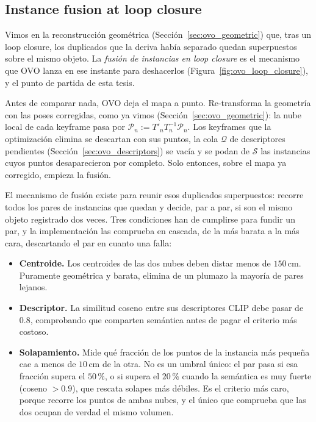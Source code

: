\subsection{Instance fusion at loop closure}
\label{sec:ovo_fusion_lc}

Vimos en la reconstrucción geométrica (Sección~\ref{sec:ovo_geometric}) que, tras un loop closure,
los duplicados que la deriva había separado quedan superpuestos sobre el mismo objeto. La
\emph{fusión de instancias en loop closure} es el mecanismo que OVO lanza en ese instante para
deshacerlos (Figura~\ref{fig:ovo_loop_closure}), y el punto de partida de esta tesis.

Antes de comparar nada, OVO deja el mapa a punto. Re-transforma la geometría con las poses
corregidas, como ya vimos (Sección~\ref{sec:ovo_geometric}): la nube local de cada keyframe pasa por
$\mathcal{P}_n := T'_n T_n^{-1} \mathcal{P}_n$. Los keyframes que la optimización elimina se descartan
con sus puntos, la cola $\mathcal{Q}$ de descriptores pendientes (Sección~\ref{sec:ovo_descriptors})
se vacía y se podan de $\mathcal{S}$ las instancias cuyos puntos desaparecieron por completo. Solo
entonces, sobre el mapa ya corregido, empieza la fusión.

El mecanismo de fusión existe para reunir esos duplicados superpuestos: recorre todos los pares de
instancias que quedan y decide, par a par, si son el mismo objeto registrado dos veces. Tres
condiciones han de cumplirse para fundir un par, y la implementación las comprueba en cascada, de la
más barata a la más cara, descartando el par en cuanto una falla:

\begin{itemize}
  \item \textbf{Centroide.} Los centroides de las dos nubes deben distar menos de $150\,\text{cm}$.
    Puramente geométrica y barata, elimina de un plumazo la mayoría de pares lejanos.
  \item \textbf{Descriptor.} La similitud coseno entre sus descriptores CLIP debe pasar de $0.8$,
    comprobando que comparten semántica antes de pagar el criterio más costoso.
  \item \textbf{Solapamiento.} Mide qué fracción de los puntos de la instancia más pequeña cae a
    menos de $10\,\text{cm}$ de la otra. No es un umbral único: el par pasa si esa fracción supera el
    $50\,\%$, o si supera el $20\,\%$ cuando la semántica es muy fuerte (coseno $> 0.9$), que rescata
    solapes más débiles. Es el criterio más caro, porque recorre los puntos de ambas nubes, y el
    único que comprueba que las dos ocupan de verdad el mismo volumen.
\end{itemize}

